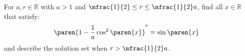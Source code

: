For $a, r \in \mathbb{R}$ with $a > 1$ and $\mfrac{1}{2} \leq r \leq \mfrac{1}{2} a$,
find all $x \in \mathbb{R}$ that satisfy:
\begin{equation*}
  \paren{1 - \frac{1}{a} \cos^2\paren{x}}^{r} = \sin\paren{x}
\end{equation*}
and describe the solution set when $r > \mfrac{1}{2} a$.
